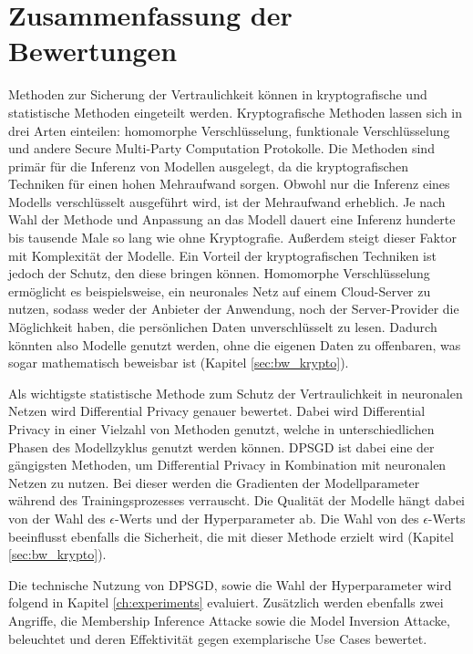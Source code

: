 \section{Zusammenfassung der Bewertungen}

Methoden zur Sicherung der Vertraulichkeit können in kryptografische und statistische Methoden eingeteilt werden.
Kryptografische Methoden lassen sich in drei Arten einteilen: homomorphe Verschlüsselung, funktionale Verschlüsselung und andere Secure Multi-Party Computation Protokolle.
Die Methoden sind primär für die Inferenz von Modellen ausgelegt, da die kryptografischen Techniken für einen hohen Mehraufwand sorgen.
Obwohl nur die Inferenz eines Modells verschlüsselt ausgeführt wird, ist der Mehraufwand erheblich. 
Je nach Wahl der Methode und Anpassung an das Modell dauert eine Inferenz hunderte bis tausende Male so lang wie ohne Kryptografie.
Außerdem steigt dieser Faktor mit Komplexität der Modelle.
Ein Vorteil der kryptografischen Techniken ist jedoch der Schutz, den diese bringen können. Homomorphe Verschlüsselung ermöglicht es beispielsweise, ein neuronales Netz auf einem Cloud-Server zu nutzen, sodass weder der Anbieter der Anwendung, noch der Server-Provider die Möglichkeit haben, die persönlichen Daten unverschlüsselt zu lesen. Dadurch könnten also Modelle genutzt werden, ohne die eigenen Daten zu offenbaren, was sogar mathematisch beweisbar ist (Kapitel \ref{sec:bw_krypto}).

Als wichtigste statistische Methode zum Schutz der Vertraulichkeit in neuronalen Netzen wird Differential Privacy genauer bewertet.
Dabei wird Differential Privacy in einer Vielzahl von Methoden genutzt, welche in unterschiedlichen Phasen des Modellzyklus genutzt werden können.
DPSGD ist dabei eine der gängigsten Methoden, um Differential Privacy in Kombination mit neuronalen Netzen zu nutzen.
Bei dieser werden die Gradienten der Modellparameter während des Trainingsprozesses verrauscht.
Die Qualität der Modelle hängt dabei von der Wahl des $\epsilon$-Werts und der Hyperparameter ab.
Die Wahl von des $\epsilon$-Werts beeinflusst ebenfalls die Sicherheit, die mit dieser Methode erzielt wird (Kapitel \ref{sec:bw_krypto}).

Die technische Nutzung von DPSGD, sowie die Wahl der Hyperparameter wird folgend in Kapitel \ref{ch:experiments} evaluiert.
Zusätzlich werden ebenfalls zwei Angriffe, die Membership Inference Attacke sowie die Model Inversion Attacke, beleuchtet und deren Effektivität gegen exemplarische Use Cases bewertet.
